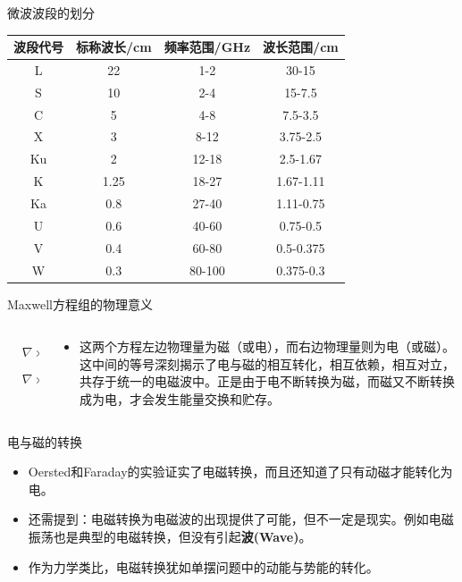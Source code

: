 \documentclass{beamer}
\begin{document}
\begin{frame}{微波波段的划分}
  \begin{tabular}{cccc}
    \toprule
    波段代号 & 标称波长/cm & 频率范围/GHz & 波长范围/cm \\
    \midrule
     L & 22 & 1-2 & 30-15 \\
     S & 10 & 2-4 & 15-7.5 \\
     C & 5 & 4-8 & 7.5-3.5 \\
     X & 3 & 8-12 & 3.75-2.5 \\
     Ku & 2 & 12-18 & 2.5-1.67 \\
     K & 1.25 & 18-27 & 1.67-1.11 \\
     Ka & 0.8 & 27-40 & 1.11-0.75 \\
     U & 0.6 & 40-60 & 0.75-0.5 \\
     V & 0.4 & 60-80 & 0.5-0.375 \\
     W & 0.3 & 80-100 & 0.375-0.3 \\
     \bottomrule
  \end{tabular}
\end{frame}

\begin{frame}{Maxwell方程组的物理意义}
  \begin{columns}
    \begin{column}{0.4\linewidth}
      \begin{align}
        & \nabla\times\vec{E} = -\frac{\partial \vec{B}}{\partial t}\\
        & \nabla\times\vec{H} = \vec{J}+\frac{\partial \vec{D}}{\partial t}
      \end{align}
    \end{column}
    \begin{column}{0.6\linewidth}
      \begin{itemize}
        \item 这两个方程左边物理量为磁（或电），而右边物理量则为电（或磁）。这中间的等号深刻揭示了电与磁的相互转化，相互依赖，相互对立，共存于统一的电磁波中。正是由于电不断转换为磁，而磁又不断转换成为电，才会发生能量交换和贮存。
      \end{itemize}
    \end{column}
  \end{columns}
\end{frame}

\begin{frame}{电与磁的转换}
  \begin{itemize}
    \item Oersted和Faraday的实验证实了电磁转换，而且还知道了只有动磁才能转化为电。
    \item 还需提到：电磁转换为电磁波的出现提供了可能，但不一定是现实。例如电磁振荡也是典型的电磁转换，但没有引起\textbf{波(Wave)}。
    \item 作为力学类比，电磁转换犹如单摆问题中的动能与势能的转化。
  \end{itemize}
\end{frame}
\end{document}
